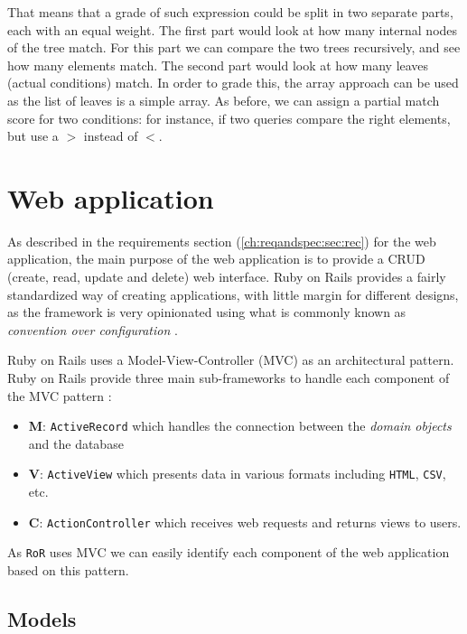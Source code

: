 That means that a grade of such expression could be split in two separate parts, each with an equal weight. The first part would look at how many internal nodes of the tree match. For this part we can compare the two trees recursively, and see how many elements match. The second part would look at how many leaves (actual conditions) match. In order to grade this, the array approach can be used as the list of leaves is a simple array. As before, we can assign a partial match score for two conditions: for instance, if two queries compare the right elements, but use a $>$ instead of $<$.

\section{Web application}


As described in the requirements section (\ref{ch:reqandspec:sec:rec}) for the web application, the main purpose of the web application is to provide a CRUD (create, read, update and delete) web interface. Ruby on Rails provides a fairly standardized way of creating applications, with little margin for different designs, as the framework is very opinionated using what is commonly known as \textit{convention over configuration} \citep{ruby_on_rails}.

Ruby on Rails uses a Model-View-Controller (MVC) as an architectural pattern. Ruby on Rails provide three main sub-frameworks to handle each component of the MVC pattern \citep{ruby_on_rails}:
\begin{itemize}
    \item \textbf{M}: \texttt{ActiveRecord} which handles the connection between the \textit{domain objects} and the database
    \item \textbf{V}: \texttt{ActiveView} which presents data in various formats including \texttt{HTML}, \texttt{CSV}, etc.
    \item \textbf{C}: \texttt{ActionController} which receives web requests and returns views to users.
\end{itemize}
As \texttt{RoR} uses MVC we can easily identify each component of the web application based on this pattern.

\subsection{Models}

